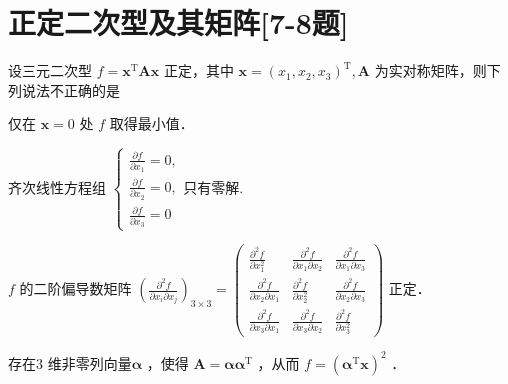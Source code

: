 \section*{正定二次型及其矩阵[7-8题]}
\begin{question}
    设三元二次型 $ f=\mathbf{x}^{\mathrm{T}} \mathbf{A} \mathbf{x} $ 正定，其中  $\mathbf{x}=\left(x_{1}, x_{2}, x_{3}\right)^{\mathrm{T}}, \mathbf{A}$ 为实对称矩阵，则下列说法不正确的是
    \begin{choices}
      \item 仅在  $\mathbf{x}=0 $ 处 $ f$  取得最小值．
      \item 齐次线性方程组  $\begin{cases}\frac{\partial f}{\partial x_{1}}=0, \\[5pt] \frac{\partial f}{\partial x_{2}}=0,  \\[5pt] \frac{\partial f}{\partial x_{3}}=0\end{cases}$只有零解. 
      \item $f $ 的二阶偏导数矩阵  $\left(\frac{\partial^{2} f}{\partial x_{i} \partial x_{j}}\right)_{3 \times 3}=\left(\begin{array}{ccc}\frac{\partial^{2} f}{\partial x_{1}^{2}} & \frac{\partial^{2} f}{\partial x_{1} \partial x_{2}} & \frac{\partial^{2} f}{\partial x_{1} \partial x_{3}} \\ \frac{\partial^{2} f}{\partial x_{2} \partial x_{1}} & \frac{\partial^{2} f}{\partial x_{2}^{2}} & \frac{\partial^{2} f}{\partial x_{2} \partial x_{3}} \\ \frac{\partial^{2} f}{\partial x_{3} \partial x_{1}} & \frac{\partial^{2} f}{\partial x_{3} \partial x_{2}} & \frac{\partial^{2} f}{\partial x_{3}^{2}}\end{array}\right) $ 正定．
      \item 存在$ 3$ 维非零列向量$\mathbf{\alpha}$  ，使得 $ \mathbf{A}=\mathbf{\alpha} \mathbf{\alpha}^{\mathrm{T}}$  ，从而  $f=\left(\mathbf{\alpha}^{\mathrm{T}} \mathbf{x}\right)^{2}$  ．
    \end{choices}
\end{question}
